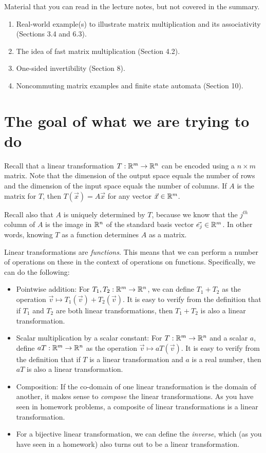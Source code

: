 \documentclass[10pt]{amsart}
\begin{document}
Material that you can read in the lecture notes, but not covered in the
summary.

\begin{enumerate}
\item Real-world example(s) to illustrate matrix multiplication and
  its associativity (Sections 3.4 and 6.3).
\item The idea of fast matrix multiplication (Section 4.2).
\item One-sided invertibility (Section 8).
\item Noncommuting matrix examples and finite state automata (Section 10).
\end{enumerate}

\section{The goal of what we are trying to do}

Recall that a linear transformation $T:\mathbb{R}^m \to \mathbb{R}^n$ can be encoded
using a $n \times m$ matrix. Note that the dimension of the output
space equals the number of rows and the dimension of the input space
equals the number of columns. If $A$ is the matrix for $T$, then
$T(\vec{x}) = A\vec{x}$ for any vector $\vec{x} \in \mathbb{R}^m$.

Recall also that $A$ is uniquely determined by $T$, because we know
that the $j^{th}$ column of $A$ is the image in $\mathbb{R}^n$ of the standard
basis vector $\vec{e_j} \in \mathbb{R}^m$. In other words, knowing $T$ as a
function determines $A$ as a matrix.

Linear transformations are {\em functions}. This means that we can
perform a number of operations on these in the context of operations
on functions. Specifically, we can do the following:

\begin{itemize}
\item Pointwise addition: For $T_1,T_2: \mathbb{R}^m \to \mathbb{R}^n$, we can define
  $T_1 + T_2$ as the operation $\vec{v} \mapsto T_1(\vec{v}) +
  T_2(\vec{v})$. It is easy to verify from the definition that if
  $T_1$ and $T_2$ are both linear transformations, then $T_1 + T_2$ is
  also a linear transformation.
\item Scalar multiplication by a scalar constant: For $T: \mathbb{R}^m \to
  \mathbb{R}^n$ and a scalar $a$, define $aT:\mathbb{R}^m \to \mathbb{R}^n$ as the operation
  $\vec{v} \mapsto aT(\vec{v})$. It is easy to verify from the
  definition that if $T$ is a linear transformation and $a$ is a real
  number, then $aT$ is also a linear transformation.
\item Composition: If the co-domain of one linear transformation is
  the domain of another, it makes sense to {\em compose} the linear
  transformations. As you have seen in homework problems, a composite
  of linear transformations is a linear transformation.
\item For a bijective linear transformation, we can define the {\em
  inverse}, which (as you have seen in a homework) also turns out to
  be a linear transformation.
\end{itemize}
\end{document}
